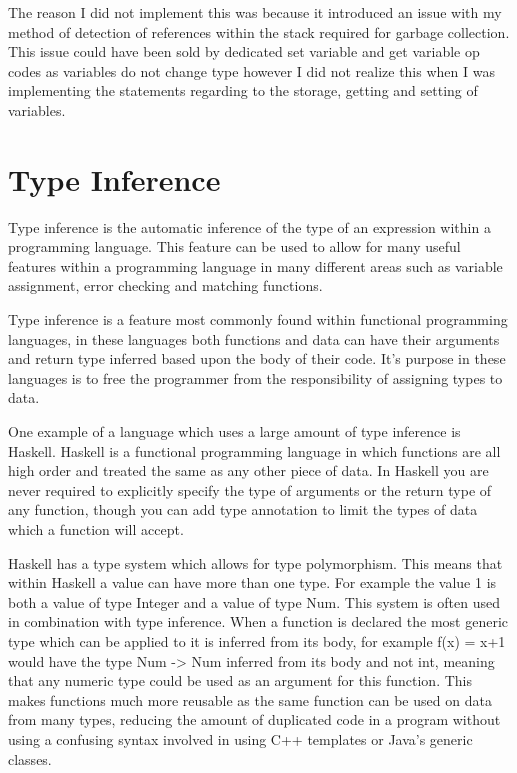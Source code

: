 \documentclass[]{final_report}
\begin{document}
The reason I did not implement this was because it introduced an issue with my method of detection of references within the stack required for garbage collection. This issue could have been sold by dedicated set variable and get variable op codes as variables do not change type however I did not realize this when I was implementing the statements regarding to the storage, getting and setting of variables.

\chapter{Type Inference}

Type inference is the automatic inference of the type of an expression within a programming language. This feature can be used to allow for many useful features within a programming language in many different areas such as variable assignment, error checking and matching functions.

Type inference is a feature most commonly found within functional programming languages, in these languages both functions and data can have their arguments and return type inferred based upon the body of their code. It's purpose in these languages is to free the programmer from the responsibility of assigning types to data.

One example of a language which uses a large amount of type inference is Haskell. Haskell is a functional programming language in which functions are all high order and treated the same as any other piece of data. In Haskell you are never required to explicitly specify the type of arguments or the return type of any function, though you can add type annotation to limit the types of data which a function will accept.

Haskell has a type system which allows for type polymorphism. This means that within Haskell a value can have more than one type. For example the value 1 is both a value of type Integer and a value of type Num. This system is often used in combination with type inference. When a function is declared the most generic type which can be applied to it is inferred from its body, for example f(x) = x+1 would have the type Num -> Num inferred from its body and not int, meaning that any numeric type could be used as an argument for this function. This makes functions much more reusable as the same function can be used on data from many types, reducing the amount of duplicated code in a program without using a confusing syntax involved in using C++ templates or Java's generic classes.
 
\end{document}
